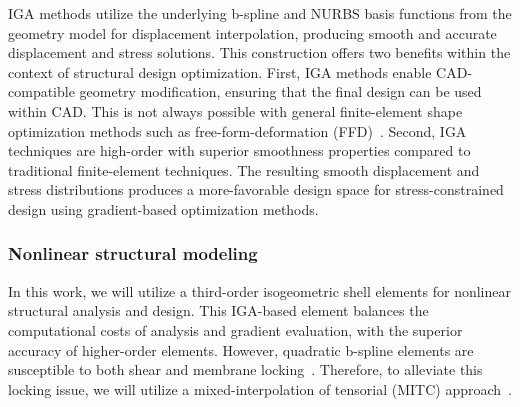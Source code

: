 \documentclass[]{aiaa-tc}
\begin{document}
IGA methods utilize the underlying b-spline and NURBS basis functions
from the geometry model for displacement interpolation, producing
smooth and accurate displacement and stress solutions.  This
construction offers two benefits within the context of structural
design optimization. First, IGA methods enable CAD-compatible geometry
modification, ensuring that the final design can be used within
CAD. This is not always possible with general finite-element shape
optimization methods such as free-form-deformation
(FFD)~\cite{Sederberg:1986:FFD, Kenway:2010:CAD}.  Second, IGA
techniques are high-order with superior smoothness properties compared
to traditional finite-element techniques. The resulting smooth
displacement and stress distributions produces a more-favorable design
space for stress-constrained design using gradient-based optimization
methods.

\subsubsection{Nonlinear structural modeling}

In this work, we will utilize a third-order isogeometric shell
elements for nonlinear structural analysis and design.  This IGA-based
element balances the computational costs of analysis and gradient
evaluation, with the superior accuracy of higher-order
elements. However, quadratic b-spline elements are susceptible to both
shear and membrane locking~\cite{Babuska:1992:OLR,
  Chapelle.Bathe}. Therefore, to alleviate this locking issue, we will
utilize a mixed-interpolation of tensorial (MITC)
approach~\cite{Dvorkin:1984:CMB, Bucalem:1993:HOM}.
\end{document}
